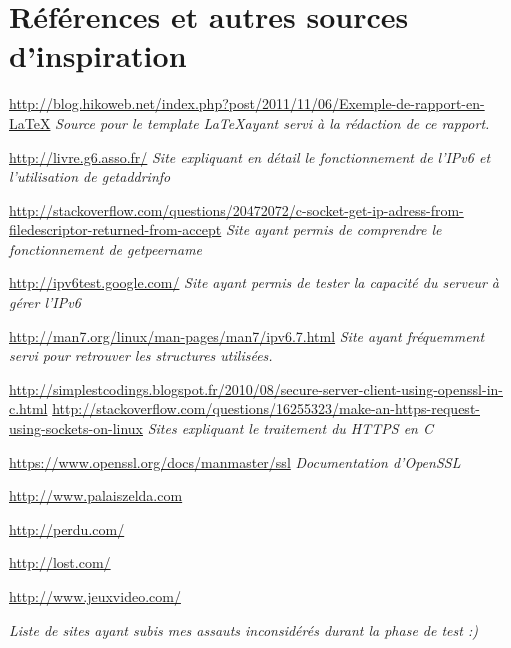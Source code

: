 \section*{Références et autres sources d'inspiration}

\url{http://blog.hikoweb.net/index.php?post/2011/11/06/Exemple-de-rapport-en-LaTeX} \linebreak
\emph{Source pour le template \LaTeX ayant servi à la rédaction de ce rapport.} \linebreak

\url{http://livre.g6.asso.fr/} \linebreak
\emph{Site expliquant en détail le fonctionnement de l'IPv6 et l'utilisation de getaddrinfo} \linebreak

\url{http://stackoverflow.com/questions/20472072/c-socket-get-ip-adress-from-filedescriptor-returned-from-accept} \linebreak
\emph{Site ayant permis de comprendre le fonctionnement de getpeername} \linebreak

\url{http://ipv6test.google.com/} \linebreak
\emph{Site ayant permis de tester la capacité du serveur à gérer l'IPv6} \linebreak

\url{http://man7.org/linux/man-pages/man7/ipv6.7.html} \linebreak
\emph{Site ayant fréquemment servi pour retrouver les structures utilisées.} \linebreak

\url{http://simplestcodings.blogspot.fr/2010/08/secure-server-client-using-openssl-in-c.html} \linebreak
\url{http://stackoverflow.com/questions/16255323/make-an-https-request-using-sockets-on-linux} \linebreak
\emph{Sites expliquant le traitement du HTTPS en C} \linebreak

\url{https://www.openssl.org/docs/manmaster/ssl} \linebreak
\emph{Documentation d'OpenSSL} \linebreak

\url{http://www.palaiszelda.com} \linebreak

\url{http://perdu.com/} \linebreak

\url{http://lost.com/} \linebreak

\url{http://www.jeuxvideo.com/} \linebreak

\emph{Liste de sites ayant subis mes assauts inconsidérés durant la phase de test :)} \linebreak

